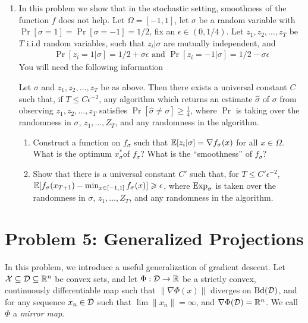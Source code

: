 \documentclass[12pt]{article}
\begin{document}
\begin{enumerate}
\item 
In this problem we show that in the stochastic setting, smoothness of the function $f$ does not help. Let $\Omega = [-1,1]$, let $\sigma$ be a random variable with $\Pr[\sigma = 1] = \Pr[\sigma = -1] = 1/2$, fix an $\epsilon \in (0,1/4)$. Let $z_1,z_2,\dots,z_T$ be $T$ i.i.d random variables, such that $z_i | \sigma$ are mutually independent, and 
\begin{eqnarray}
\Pr[z_i =  1 | \sigma] = 1/2 + \sigma \epsilon \text{ and } \Pr[z_i =  -1 | \sigma] = 1/2 - \sigma \epsilon 
\end{eqnarray}
You will need the following information
\begin{lemma*} Let $\sigma$ and $z_1,z_2,\dots,z_T$ be as above. Then there exists a universal constant $C$ such that, if $T \le C \epsilon^{-2}$, any algorithm which returns an estimate $\widehat{\sigma}$ of $\sigma$ from observing $z_1,z_2,\dots,z_T$ satisfies $\Pr[\widehat{\sigma} \ne \sigma] \ge \frac{1}{4}$, where $\Pr$ is taking over the randomness in $\sigma$, $z_1,\dots,Z_T$, and any randomness in the algorithm. 
\end{lemma*}
\begin{enumerate}
\item
Construct a function on $f_{\sigma}$ such that $\operatorname*{\mathbb{E}}[z_i | \sigma] = \nabla f_{\sigma}(x)$ for all $x \in \Omega$. What is the optimum $x^*_{\sigma} $of $f_{\sigma}$? What is the ``smoothness'' of $f_{\sigma}$?
\item 
Show that there is a universal constant $C'$ such that, for $T \le C'\epsilon^{-2}$, $\operatorname*{\mathbb{E}}[f_{\sigma}(x_{T+1}) - \min_{x \in [-1,1]}f_{\sigma}(x)] \geqslant \epsilon$, where $\mathrm{Exp}_{\sigma}$ is taken over the randomness in $\sigma$, $z_1,\dots,Z_T$, and any randomness in the algorithm.  
\end{enumerate}
\end{enumerate}
\section*{Problem 5: Generalized Projections}

In this problem, we introduce a useful generalization of gradient descent. Let
${\cal X} \subseteq {\cal D} \subseteq \mathbb{R}^n$ be convex sets, and let $\Phi: {\cal D} \to \mathbb{R}$ be
a strictly convex, continuously differentiable map such that $\|\nabla
\Phi(x)\|$ diverges on $\mathrm{Bd}({\cal D})$, and for any sequence $x_n \in {\cal D}$ such that $\lim \|x_n\| = \infty$, and $\nabla \Phi({\cal D}) = \mathbb{R}^n$. We call $\Phi$ a \emph{mirror map}.
\end{document}
